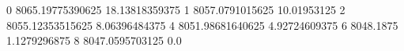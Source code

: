 0 8065.19775390625 18.13818359375
1 8057.0791015625 10.01953125
2 8055.12353515625 8.06396484375
4 8051.98681640625 4.92724609375
6 8048.1875 1.1279296875
8 8047.0595703125 0.0
